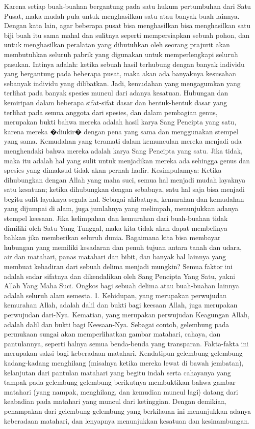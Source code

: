 \documentclass[]{article}
\begin{document}
Karena setiap buah-buahan bergantung pada satu hukum pertumbuhan dari Satu Pusat, maka mudah pula untuk menghasilkan satu atau banyak  buah lainnya. Dengan kata lain,  agar beberapa pusat bisa menghasilkan bisa menghasilkan satu biji buah itu sama mahal dan sulitnya seperti mempersiapkan sebuah pohon, dan untuk menghasilkan peralatan yang dibutuhkan oleh seorang prajurit akan membutuhkan seluruh pabrik yang digunakan untuk memperlengkapi seluruh  pasukan.  Intinya adalah: ketika sebuah hasil terhubung dengan banyak individu yang bergantung pada beberapa pusat, maka akan ada banyaknya kesusahan sebanyak individu yang dilibatkan. Jadi, kemudahan yang mengagumkan yang terlihat pada banyak spesies muncul dari adanya kesatuan. 
Hubungan dan kemiripan dalam beberapa sifat-sifat dasar dan bentuk-bentuk dasar yang terlihat pada semua anggota dari spesies, dan dalam pembagian genus, merupakan bukti bahwa mereka adalah hasil karya Sang Pencipta yang satu, karena mereka �diukir� dengan pena yang sama dan menggunakan stempel yang sama.  Kemudahan yang teramati dalam kemunculan mereka menjadi ada menghendaki bahwa mereka adalah karya Sang  Pencipta yang satu. Jika tidak, maka itu adalah hal yang sulit untuk menjadikan mereka ada sehingga genus dan spesies yang dimaksud tidak akan pernah hadir. 
 Kesimpulannya: Ketika dihubungkan dengan Allah yang maha suci, semua hal menjadi mudah layaknya satu kesatuan; ketika dihubungkan dengan sebabnya, satu hal saja bisa menjadi begitu sulit layaknya segala hal. Sebagai akibatnya, kemurahan dan kemudahan yang dijumpai di alam, juga jumlahnya yang melimpah, menunjukkan adanya stempel keesaan. Jika kelimpahan dan kemurahan dari buah-buahan tidak dimiliki oleh Satu Yang Tunggal, maka kita tidak akan dapat membelinya bahkan jika memberikan seluruh dunia. Bagaimana kita bisa membayar hubungan yang memiliki kesadaran dan penuh tujuan antara tanah dan udara, air dan matahari,  panas matahari dan bibit, dan banyak hal lainnya yang membuat kehadiran dari sebuah delima  menjadi mungkin? Semua faktor ini adalah sadar sifatnya dan dikendalikan oleh Sang Pencipta Yang Satu, yakni Allah Yang Maha Suci. Ongkos bagi sebuah delima atau buah-buahan lainnya adalah seluruh alam semesta. 
1. Kehidupan, yang merupakan perwujudan kemurahan Allah, adalah dalil dan bukti bagi keesaan Allah, juga merupakan perwujudan dari-Nya.  Kematian, yang merupakan perwujudan Keagungan Allah, adalah dalil dan bukti bagi Keesaan-Nya.
Sebagai contoh, gelembung pada permukaan sungai akan memperlihatkan gambar matahari, cahaya, dan pantulannya, seperti halnya semua benda-benda yang transparan. Fakta-fakta ini merupakan saksi bagi keberadaan matahari. Kendatipun gelembung-gelembung kadang-kadang menghilang (misalnya ketika mereka lewat di bawah jembatan), kelanjutan dari pantulan matahari yang begitu indah serta cahayanya yang tampak pada gelembung-gelembung berikutnya membuktikan bahwa gambar matahari (yang nampak, menghilang, dan kemudian muncul lagi) datang dari keabadian pada matahari yang muncul dari ketinggian. Dengan demikian, penampakan dari gelembung-gelembung yang berkilauan ini menunjukkan adanya keberadaan matahari, dan lenyapnya menunjukkan kesatuan dan kesinambungan. 
\end{document}
